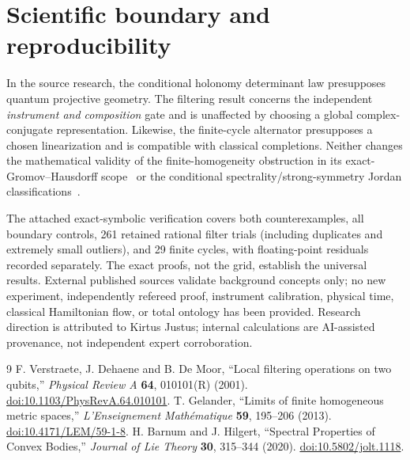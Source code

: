 \documentclass[10pt,letterpaper]{article}
\begin{document}
\section{Scientific boundary and reproducibility}
In the source research, the conditional holonomy determinant law presupposes quantum projective geometry. The filtering result concerns the independent \emph{instrument and composition} gate and is unaffected by choosing a global complex-conjugate representation. Likewise, the finite-cycle alternator presupposes a chosen linearization and is compatible with classical completions. Neither changes the mathematical validity of the finite-homogeneity obstruction in its exact-Gromov--Hausdorff scope~\cite{Gelander2013} or the conditional spectrality/strong-symmetry Jordan classifications~\cite{BarnumHilgert2020}.

The attached exact-symbolic verification covers both counterexamples, all boundary controls, 261 retained rational filter trials (including duplicates and extremely small outliers), and 29 finite cycles, with floating-point residuals recorded separately. The exact proofs, not the grid, establish the universal results. External published sources validate background concepts only; no new experiment, independently refereed proof, instrument calibration, physical time, classical Hamiltonian flow, or total ontology has been provided. Research direction is attributed to Kirtus Justus; internal calculations are AI-assisted provenance, not independent expert corroboration.

\begin{thebibliography}{9}\small
{} F. Verstraete, J. Dehaene and B. De Moor, ``Local filtering operations on two qubits,'' \emph{Physical Review A} \textbf{64}, 010101(R) (2001). \href{https://doi.org/10.1103/PhysRevA.64.010101}{doi:10.1103/PhysRevA.64.010101}.
 T. Gelander, ``Limits of finite homogeneous metric spaces,'' \emph{L'Enseignement Math\'ematique} \textbf{59}, 195--206 (2013). \href{https://doi.org/10.4171/LEM/59-1-8}{doi:10.4171/LEM/59-1-8}.
 H. Barnum and J. Hilgert, ``Spectral Properties of Convex Bodies,'' \emph{Journal of Lie Theory} \textbf{30}, 315--344 (2020). \href{https://doi.org/10.5802/jolt.1118}{doi:10.5802/jolt.1118}.
\end{thebibliography}
\end{document}
